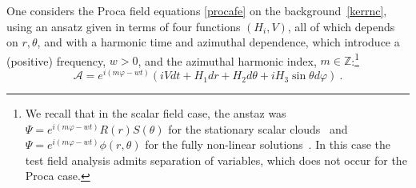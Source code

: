\documentclass{article}
\numberwithin{equation}{section}
\begin{document}
One considers the Proca field equations \eqref{procafe} on the background~\eqref{kerrnc}, using an ansatz given in terms of four functions $(H_i,V)$, all of which depends on $r,\theta$, and with a harmonic time and azimuthal dependence, which introduce a (positive) frequency, $w>0$, and the azimuthal harmonic index, $m\in \mathbb{Z}$:\footnote{We recall that in the scalar field case, the anstaz was  
 $\Psi=e^{i(m\varphi-wt)}R(r)S(\theta)$ 
for the stationary scalar clouds~\cite{Hod:2012px,Benone:2014ssa} and 
 $\Psi=e^{i(m\varphi-wt)}\phi(r,\theta)$ 
for the fully non-linear solutions~\cite{Herdeiro:2014goa}. In this case the test field analysis admits separation of variables, which does not occur for the Proca case.}
%
\begin{equation}
\mathcal{A}=e^{i(m\varphi-w t)}\left(
 iV dt  +H_1dr+H_2d\theta+i H_3 \sin \theta d\varphi 
\right) \ .
\label{procaclouds}
\end{equation}
\end{document}
